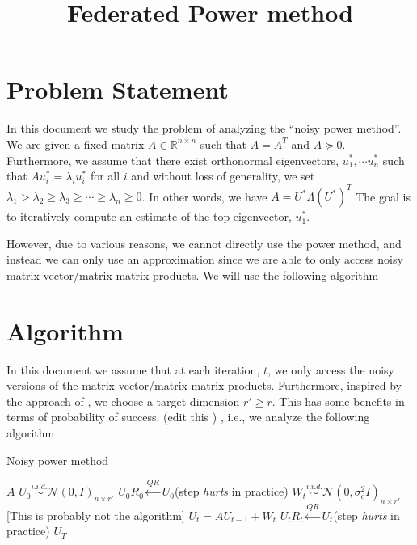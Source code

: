 \documentclass[10pt]{article}
\title{\textbf{Federated Power method}}
\author{}
\date{}
\newcommand{\R}{\mathbb{R}}
\begin{document}
\maketitle


\section{Problem Statement}
In this document we study the problem of analyzing the ``noisy power method''. We are given a fixed matrix $A \in \R^{n \times n}$ such that $A = A^T$ and $A \succeq 0$. Furthermore, we assume that there exist orthonormal eigenvectors, $u_1^*, \cdots u_n^*$ such that $A u_i^* = \lambda_i u_i^*$ for all $i$ and without loss of generality, we set $\lambda_1 > \lambda_2 \geq \lambda_3 \geq \cdots \geq \lambda_n \geq 0$. In other words, we have $A = U^* \Lambda (U^*)^T$ The goal is to iteratively compute an estimate of the top eigenvector, $u_1^*$. 

However, due to various reasons, we cannot directly use the power method, and instead we can only use an approximation since we are able to only access noisy matrix-vector/matrix-matrix  products. We will use the following algorithm

\section{Algorithm}
In this document we assume that at each iteration, $t$, we only access the noisy versions of the matrix vector/matrix matrix products. Furthermore, inspired by the approach of \cite{noisy_pm}, we choose a target dimension $r' \geq r$. This has some benefits in terms of probability of success. (edit this ) , i.e., we analyze the following algorithm 

\begin{algorithm}[H]
\caption{Noisy power method}\label{algo:rankr}
  \begin{algorithmic}[1]
    \REQUIRE $A$ 
    \STATE $U_0 \overset{i.i.d.}{\sim} \mathcal{N}(0, I)_{n \times r'}$ %
    \STATE $U_0 R_0 \overset{QR}{\leftarrow} U_0$(step {\em hurts} in practice)
    \STATE $W_t \overset{i.i.d.}{\sim} \mathcal{N}(0, \sigma_c^2 I)_{n \times r'}$ [This is probably not the algorithm]
    \STATE $U_t = A U_{t-1} + W_t$ 
    \STATE $U_t R_t \overset{QR}{\leftarrow} U_t$(step {\em hurts} in practice)
    \ENDFOR
    \ENSURE $U_T$ 
  \end{algorithmic}
\end{algorithm}
\end{document}

